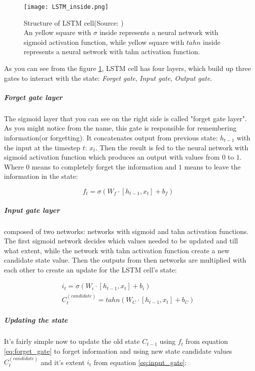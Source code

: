 \begin{figure}[H]
	\texttt{[image: LSTM\_inside.png]}
	\caption{
		Structure of LSTM cell(Source: \cite{ColahChristopher2015}) \\
		An yellow square with $\sigma$ inside represents a neural
		network with sigmoid activation function, while yellow square with $tahn$ inside represents
		a neural network with tahn activation function.
		}
	\label{img:lstm} %
\end{figure}


As you can see from the figure \ref{img:lstm}, LSTM cell has four layers,
which build up three gates to interact with the state:
\emph{Forget gate}, \emph{Input gate}, \emph{Output gate}.


\subparagraph{Forget gate layer}
The sigmoid layer that you can see on the right side is
called "forget gate layer". As you might notice from the name, this gate is responsible
for remembering information(or forgetting). It concatenates output from previous state: $h_{t-1}$
with the input at the timestep $t$: $x_t$. Then the result is fed to the neural network
with sigmoid activation function which produces an output with values from $0$ to $1$.
Where 0 means to completely forget the information and $1$ means to leave
the information in the state:

\begin{equation} \label{eq:forget_gate}
	f_t = \sigma (W_f \cdot [h_{t-1}, x_t] + b_f)
\end{equation}

\subparagraph{Input gate layer} composed of two networks: networks with sigmoid
and tahn activation functions. The first sigmoid network decides which values needed
to be updated and till what extent, while the network with tahn activation function create a
new candidate state value. Then the outputs from then networks are multiplied with each other
to create an update for the LSTM cell's state:

\begin{align} \label{eq:input_gate}
	i_t = \sigma (W_i \cdot [h_{t-1}, x_t] + b_i) \nonumber\\
	C_t^{(candidate)} = tahn(W_C \cdot [h_{t-1}, x_t] + b_C)
\end{align}

\subparagraph{Updating the state}
It's fairly simple now to update the old state $C_{t-1}$ using $f_t$ from equation
\ref{eq:forget_gate} to forget information and using new state candidate values
$C_t^{(candidate)}$ and it's extent $i_t$ from equation \ref{eq:input_gate}:

